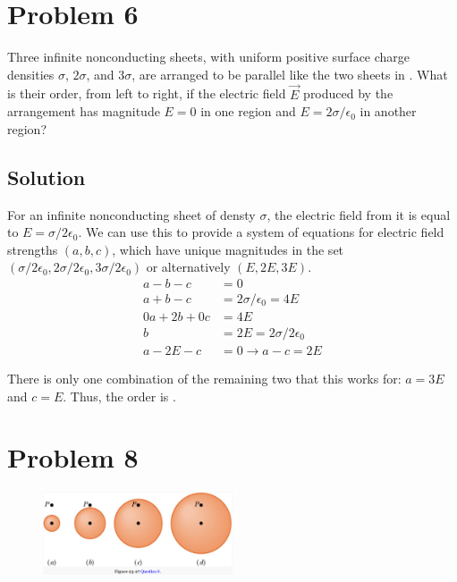 \documentclass[12pt]{article}
\begin{document}
\pagebreak
\section{Problem 6}
Three infinite nonconducting sheets, with uniform positive surface charge densities $\sigma$, $2\sigma$, and $3\sigma$, are arranged to be parallel like the two sheets in . What is their order, from left to right, if the electric field $\vec{E}$ produced by the arrangement has magnitude $E = 0$ in one region and $E = 2\sigma/\epsilon_0$ in another region?

\subsection*{Solution}
For an infinite nonconducting sheet of densty $\sigma$, the electric field from it is equal to $E = \sigma/2\epsilon_0$. We can use this to provide a system of equations for electric field strengths $(a, b, c)$, which have unique magnitudes in the set $(\sigma/2\epsilon_0, 2\sigma/2\epsilon_0, 3\sigma/2\epsilon_0)$ or alternatively $(E, 2E, 3E)$. 
\begin{align*}
    a - b - c &= 0\\
    a + b - c &= 2\sigma/\epsilon_0 = 4E\\
    0a + 2b + 0c &= 4E\\
    b &= 2E = 2\sigma/2\epsilon_0\\
    a - 2E - c &= 0 \rightarrow a - c = 2E
\end{align*}

There is only one combination of the remaining two that this works for: $a = 3E$ and $c = E$. Thus, the order is \boxed{\langle 3\sigma, 2\sigma, \sigma \rangle}.

\pagebreak
\section{Problem 8}
\begin{figure}
    \vspace{-30pt}
    \includegraphics[width=0.5\textwidth]{picture_4.png} 
\end{figure}
\end{document}
